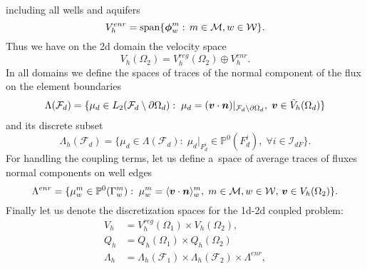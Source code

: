 including all wells and aquifers
\begin{equation}
    V^{enr}_h = \textrm{span}\{\mathbf{\boldsymbol{\phi}}^m_w:\, m\in\mathcal{M}, w\in\mathcal{W}\}.
\end{equation}
Thus we have on the 2d domain the velocity space
\begin{equation}
    V_h(\Omega_2) = V^{reg}_{h}(\Omega_2) \oplus V^{enr}_h.
\end{equation}
In all domains we define the spaces of traces of the normal component of the flux on the element boundaries
\begin{equation}
    \Lambda(\mathcal{F}_d) = \{\mu_d \in L_2(\mathcal{F}_d\setminus\partial\Omega_d):\;
        \mu_d=(\mathbf{\boldsymbol{v}}\cdot \mathbf{\boldsymbol{n}})|_{\mathcal{F}_d\setminus\partial\Omega_d},\; \mathbf{\boldsymbol{v}}\in \tilde V_h(\Omega_d)\}
\end{equation}
and its discrete subset
\begin{equation}
    \Lambda_h(\mathcal{F}_d) = \{\mu_d \in \Lambda(\mathcal{F}_d):\;
        \mu_d|_{F^i_d}\in\mathbb{P}^0(F^i_d),\; \forall i\in\mathcal{I}_{dF}\}.
\end{equation}
For handling the coupling terms, let us define a~space of average traces of fluxes normal components on well edges
\begin{equation} \label{eqn:lambda_w_space_2d}
    \Lambda^{enr} = \{\mu^m_w\in \mathbb P^0(\Gamma^m_w):\;
    \mu^m_w=\langle\mathbf{\boldsymbol{v}}\cdot \mathbf{\boldsymbol{n}}\rangle^m_w,\; m\in\mathcal{M}, w\in\mathcal{W},\, \mathbf{\boldsymbol{v}}\in V_h(\Omega_2)\}.
\end{equation}
%
Finally let us denote the discretization spaces for the 1d-2d coupled problem:
\begin{align}
    V_h &= V^{reg}_h(\Omega_1) \times V_h(\Omega_2), \label{eqn:vel_h_space}\\
    Q_h &= Q_h(\Omega_1) \times Q_h(\Omega_2) \label{eqn:press_h_space} \\
    \Lambda_h &= \Lambda_h(\mathcal{F}_1)\times \Lambda_h(\mathcal{F}_2) \times \Lambda^{enr}, \label{eqn:lambda_h_space}
\end{align}


